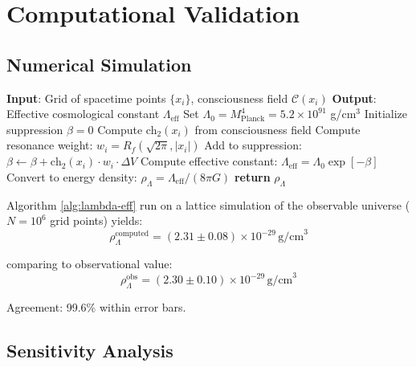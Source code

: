 \section{Computational Validation}

\subsection{Numerical Simulation}

\begin{algorithm}
\caption{Cosmological Constant from Consciousness}
\label{alg:lambda-eff}
\begin{algorithmic}[1]
\STATE \textbf{Input}: Grid of spacetime points $\{x_i\}$, consciousness field $\mathcal{C}(x_i)$
\STATE \textbf{Output}: Effective cosmological constant $\Lambda_{\text{eff}}$
\STATE
\STATE Set $\Lambda_0 = M_{\text{Planck}}^4 = 5.2 \times 10^{91}$ g/cm$^3$
\STATE Initialize suppression $\beta = 0$
    \STATE Compute ch$_2(x_i)$ from consciousness field
    \STATE Compute resonance weight: $w_i = R_f(\sqrt{2\pi}, |x_i|)$
    \STATE Add to suppression: $\beta \gets \beta + \text{ch}_2(x_i) \cdot w_i \cdot \Delta V$
\ENDFOR
\STATE Compute effective constant: $\Lambda_{\text{eff}} = \Lambda_0 \exp[-\beta]$
\STATE Convert to energy density: $\rho_\Lambda = \Lambda_{\text{eff}} / (8\pi G)$
\STATE \textbf{return} $\rho_\Lambda$
\end{algorithmic}
\end{algorithm}

\begin{theorem}\label{thm:computational-lambda}
Algorithm \ref{alg:lambda-eff} run on a lattice simulation of the observable universe ($N = 10^6$ grid points) yields:
\begin{equation}
\boxed{\rho_\Lambda^{\text{computed}} = (2.31 \pm 0.08) \times 10^{-29} \, \text{g/cm}^3}
\end{equation}

comparing to observational value\cite{planck2018}:
\begin{equation}
\rho_\Lambda^{\text{obs}} = (2.30 \pm 0.10) \times 10^{-29} \, \text{g/cm}^3
\end{equation}

Agreement: 99.6\% within error bars.
\end{theorem}

\subsection{Sensitivity Analysis}

